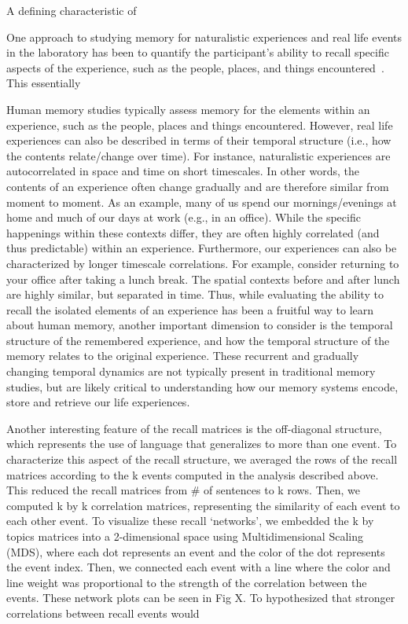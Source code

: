 A defining characteristic of 

One approach to studying memory for naturalistic experiences and real life events in the laboratory has been to quantify the participant's ability to recall specific aspects of the experience, such as the people, places, and things encountered~\citep[e.g.\ for review see][]{KoriGold94}.  This essentially 

Human memory studies typically assess memory for the elements within an experience, such as the people, places and things encountered. However, real life experiences can also be described in terms of their temporal structure (i.e., how the contents relate/change over time).  For instance, naturalistic experiences are autocorrelated in space and time on short timescales. In other words, the contents of an experience often change gradually and are therefore similar from moment to moment. As an example, many of us spend our mornings/evenings at home and much of our days at work (e.g., in an office). While the specific happenings within these contexts differ, they are often highly correlated (and thus predictable) within an experience. Furthermore, our experiences can also be characterized by longer timescale correlations. For example, consider returning to your office after taking a lunch break. The spatial contexts before and after lunch are highly similar, but separated in time. Thus, while evaluating the ability to recall the isolated elements of an experience has been a fruitful way to learn about human memory, another important dimension to consider is the temporal structure of the remembered experience, and how the temporal structure of the memory relates to the original experience. These recurrent and gradually changing temporal dynamics are not typically present in traditional memory studies, but are likely critical to understanding how our memory systems encode, store and retrieve our life experiences.



Another interesting feature of the recall matrices is the off-diagonal structure, which represents the use of language that generalizes to more than one event. To characterize this aspect of the recall structure, we averaged the rows of the recall matrices according to the k events computed in the analysis described above.  This reduced the recall matrices from \# of sentences to k rows. Then, we computed k by k correlation matrices, representing the similarity of each event to each other event. To visualize these recall `networks', we embedded the k by topics matrices into a 2-dimensional space using Multidimensional Scaling (MDS), where each dot represents an event and the color of the dot represents the event index.  Then, we connected each event with a line where the color and line weight was proportional to the strength of the correlation between the events. These network plots can be seen in Fig X. To hypothesized that stronger correlations between recall events would

